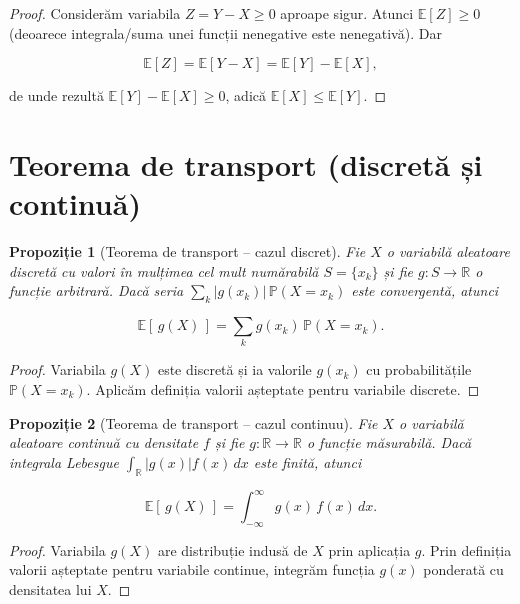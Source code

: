 \documentclass[12pt]{article}
\theoremstyle{plain}
\newtheorem{proposition}{Propoziție}
\begin{document}
\begin{proof}
Considerăm variabila $Z = Y - X \ge 0$ aproape sigur.
Atunci $\mathbb{E}[Z] \ge 0$ (deoarece integrala/suma unei funcții nenegative este nenegativă).
Dar


\[
\mathbb{E}[Z] = \mathbb{E}[Y-X] = \mathbb{E}[Y] - \mathbb{E}[X],
\]


de unde rezultă $\mathbb{E}[Y] - \mathbb{E}[X] \ge 0$, adică $\mathbb{E}[X] \le \mathbb{E}[Y]$.
\end{proof}

\section{Teorema de transport (discretă și continuă)}

\begin{proposition}[Teorema de transport – cazul discret]
Fie $X$ o variabilă aleatoare discretă cu valori în mulțimea cel mult numărabilă
$S = \{x_k\}$ și fie $g:S\to\mathbb{R}$ o funcție arbitrară.
Dacă seria $\sum_k |g(x_k)|\,\mathbb{P}(X=x_k)$ este convergentă, atunci



\[
\mathbb{E}[\,g(X)\,] = \sum_{k} g(x_k)\,\mathbb{P}(X = x_k).
\]



\end{proposition}

\begin{proof}
Variabila $g(X)$ este discretă și ia valorile $g(x_k)$ cu probabilitățile
$\mathbb{P}(X=x_k)$. Aplicăm definiția valorii așteptate pentru variabile discrete.
\end{proof}

\begin{proposition}[Teorema de transport – cazul continuu]
Fie $X$ o variabilă aleatoare continuă cu densitate $f$ și fie $g:\mathbb{R}\to\mathbb{R}$ o funcție măsurabilă.
Dacă integrala Lebesgue $\int_{\mathbb{R}} |g(x)| f(x)\,dx$ este finită, atunci



\[
\mathbb{E}[\,g(X)\,] = \int_{-\infty}^{\infty} g(x)\, f(x)\, dx.
\]



\end{proposition}

\begin{proof}
Variabila $g(X)$ are distribuție indusă de $X$ prin aplicația $g$.
Prin definiția valorii așteptate pentru variabile continue, integrăm funcția $g(x)$
ponderată cu densitatea lui $X$.
\end{proof}
\end{document}
